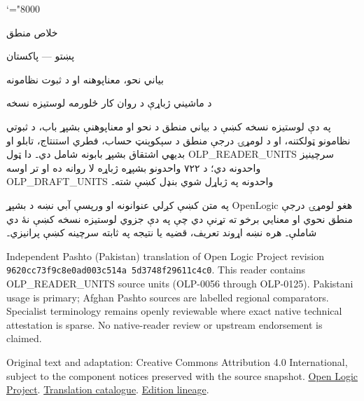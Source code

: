 \documentclass[12pt,a4paper,oneside]{report}
\theoremstyle{definition}
\begin{document}
\setRTL
\mathcode`\!="8000
\begin{titlepage}
\thispagestyle{empty}
\begin{center}
\vspace*{24mm}
{\Huge خلاص منطق}\par\bigskip
{\Large پښتو — پاکستان}\par\bigskip
{\LARGE بياني نحو، معناپوهنه او د ثبوت نظامونه}\par\bigskip
د ماشيني ژباړې د روان کار څلورمه لوستيزه نسخه
\end{center}
\bigskip
په دې لوستيزه نسخه کښې د بياني منطق د نحو او معناپوهنې بشپړ باب،
د ثبوتي نظامونو ټولکتنه، او د لومړۍ درجې منطق د سېکوېنټ حساب، فطري
استنتاج، تابلو او بديهي اشتقاق بشپړ بابونه شامل دي۔ دا ټول
OLP_READER_UNITS سرچينيز واحدونه دي؛ د ۷۲۲ واحدونو بشپړه ژباړه لا
روانه ده او تر اوسه OLP_DRAFT_UNITS واحدونه په ژباړل شوي بنډل کښې
شته۔

په متن کښې کږلي عنوانونه او ورپسې آبي \LR{\latinfont [OLP]} نښه د
بشپړ OpenLogic هغو لومړۍ درجې منطق نحوي او معنايي برخو ته تړنې دي چې
په دې جزوي لوستيزه نسخه کښې نۀ دي شاملې۔ هره نښه اړوند تعريف، قضيه
يا نتيجه په ثابته سرچينه کښې پرانيزي۔

\begin{LTR}\latinfont\small
Independent Pashto (Pakistan) translation of Open Logic Project revision
\texttt{9620cc73\allowbreak f9c8e0ad\allowbreak 003c514a\allowbreak
5d3748f2\allowbreak 9611c4c0}. This reader contains
OLP_READER_UNITS source units (OLP-0056 through OLP-0125). Pakistani usage is
primary; Afghan Pashto sources are labelled regional comparators. Specialist
terminology remains openly reviewable where exact native technical attestation
is sparse. No native-reader review or upstream endorsement is claimed.

Original text and adaptation: Creative Commons Attribution 4.0 International,
subject to the component notices preserved with the source snapshot.
\href{https://openlogicproject.org/}{Open Logic Project}.\quad
\href{https://github.com/KokunoYumeto/OpenLogic-translations}{Translation catalogue}.\quad
\href{https://doi.org/10.5281/zenodo.22307197}{Edition lineage}.
\end{LTR}
\end{titlepage}
\tableofcontents
\clearpage
\end{document}
